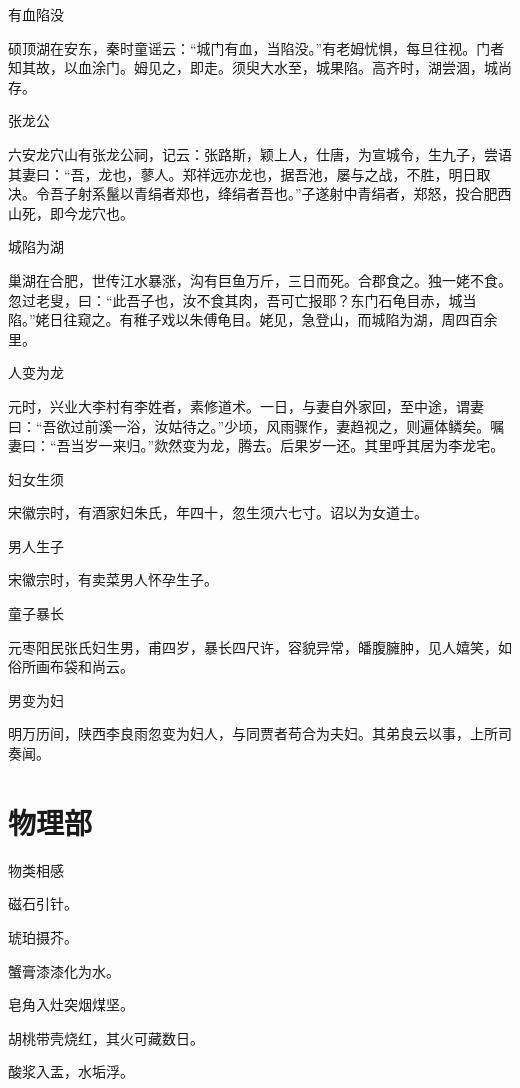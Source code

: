 \documentclass[a4paper,12pt,UTF8,twoside]{ctexbook}
\begin{document}
    有血陷没
    
    硕顶湖在安东，秦时童谣云：“城门有血，当陷没。”有老姆忧惧，每旦往视。门者知其故，以血涂门。姆见之，即走。须臾大水至，城果陷。高齐时，湖尝涸，城尚存。
    
    张龙公
    
    六安龙穴山有张龙公祠，记云：张路斯，颖上人，仕唐，为宣城令，生九子，尝语其妻曰：“吾，龙也，蓼人。郑祥远亦龙也，据吾池，屡与之战，不胜，明日取决。令吾子射系鬣以青绢者郑也，绛绢者吾也。”子遂射中青绢者，郑怒，投合肥西山死，即今龙穴也。
    
    城陷为湖
    
    巢湖在合肥，世传江水暴涨，沟有巨鱼万斤，三日而死。合郡食之。独一姥不食。忽过老叟，曰：“此吾子也，汝不食其肉，吾可亡报耶？东门石龟目赤，城当陷。”姥日往窥之。有稚子戏以朱傅龟目。姥见，急登山，而城陷为湖，周四百余里。
    
    人变为龙
    
    元时，兴业大李村有李姓者，素修道术。一日，与妻自外家回，至中途，谓妻曰：“吾欲过前溪一浴，汝姑待之。”少顷，风雨骤作，妻趋视之，则遍体鳞矣。嘱妻曰：“吾当岁一来归。”欻然变为龙，腾去。后果岁一还。其里呼其居为李龙宅。
    
    妇女生须
    
    宋徽宗时，有酒家妇朱氏，年四十，忽生须六七寸。诏以为女道士。
    
    男人生子
    
    宋徽宗时，有卖菜男人怀孕生子。
    
    童子暴长
    
    元枣阳民张氏妇生男，甫四岁，暴长四尺许，容貌异常，皤腹臃肿，见人嬉笑，如俗所画布袋和尚云。
    
    男变为妇
    
    明万历间，陕西李良雨忽变为妇人，与同贾者苟合为夫妇。其弟良云以事，上所司奏闻。
    
    \part{物理部}
    
    物类相感
    
    磁石引针。
    
    琥珀摄芥。
    
    蟹膏漆漆化为水。
    
    皂角入灶突烟煤坚。
    
    胡桃带壳烧红，其火可藏数日。
    
    酸浆入盂，水垢浮。
    
\end{document}

